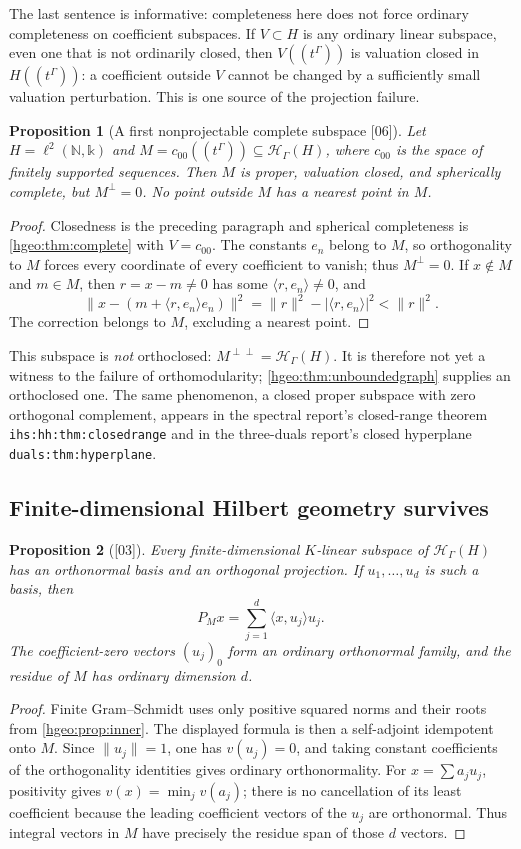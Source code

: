 \documentclass[11pt,letterpaper]{article}
\numberwithin{equation}{section}
\newtheorem{proposition}[proposition]{Proposition}
\theoremstyle{definition}
\theoremstyle{remark}
\newcommand{\N}{\mathbb N}
\newcommand{\kk}{\mathbb k}
\newcommand{\K}{K}
\newcommand{\HH}[1]{\mathscr H_\Gamma(#1)}
\newcommand{\ip}[2]{\langle #1,#2\rangle}
\newcommand{\norm}[1]{\lVert #1\rVert}
\newcommand{\abs}[1]{\lvert #1\rvert}
\newcommand{\src}[1]{\textup{\textsf{\small[#1]}}}
\newcommand{\replabel}[1]{\nolinkurl{#1}}
\begin{document}
The last sentence is informative: completeness here does not force
ordinary completeness on coefficient subspaces. If $V\subset H$ is
any ordinary linear subspace, even one that is not ordinarily closed,
then $V((t^\Gamma))$ is valuation closed in $H((t^\Gamma))$: a coefficient
outside $V$ cannot be changed by a sufficiently small valuation
perturbation. This is one source of the projection failure.

\begin{proposition}[A first nonprojectable complete subspace
\src{06}]\label{hgeo:prop:c00}
Let $H=\ell^2(\N,\kk)$ and $M=c_{00}((t^\Gamma))\subseteq\HH{H}$, where
$c_{00}$ is the space of finitely supported sequences. Then $M$ is proper,
valuation closed, and spherically complete, but $M^\perp=0$. No point
outside $M$ has a nearest point in $M$.
\end{proposition}
\begin{proof}
Closedness is the preceding paragraph and spherical completeness is
\cref{hgeo:thm:complete} with $V=c_{00}$. The constants $e_n$ belong to $M$,
so orthogonality to $M$ forces every coordinate of every coefficient to
vanish; thus $M^\perp=0$. If $x\notin M$ and $m\in M$, then $r=x-m\ne0$ has
some $\ip{r}{e_n}\ne0$, and
\[
 \norm{x-(m+\ip{r}{e_n}e_n)}^2
 =\norm{r}^2-\abs{\ip{r}{e_n}}^2<\norm{r}^2.
\]
The correction belongs to $M$, excluding a nearest point.
\end{proof}

This subspace is \emph{not} orthoclosed: $M^{\perp\perp}=\HH{H}$. It is
therefore not yet a witness to the failure of orthomodularity;
\cref{hgeo:thm:unboundedgraph} supplies an orthoclosed one. The same
phenomenon, a closed proper subspace with zero orthogonal complement,
appears in the spectral report's closed-range theorem
\replabel{ihs:hh:thm:closedrange} and in the three-duals report's closed
hyperplane \replabel{duals:thm:hyperplane}.

\subsection{Finite-dimensional Hilbert geometry survives}
\begin{proposition}[\src{03}]\label{hgeo:prop:finite}
Every finite-dimensional $\K$-linear subspace of $\HH{H}$ has an
orthonormal basis and an orthogonal projection. If
$u_1,\ldots,u_d$ is such a basis, then
\[
 P_Mx=\sum_{j=1}^d\ip{x}{u_j}u_j.
\]
The coefficient-zero vectors $(u_j)_0$ form an ordinary orthonormal
family, and the residue of $M$ has ordinary dimension $d$.
\end{proposition}
\begin{proof}
Finite Gram--Schmidt uses only positive squared norms and their roots
from \cref{hgeo:prop:inner}. The displayed formula is then a
self-adjoint idempotent onto $M$. Since $\norm{u_j}=1$, one has
$v(u_j)=0$, and taking constant coefficients of the orthogonality
identities gives ordinary orthonormality.
For $x=\sum a_ju_j$, positivity gives
$v(x)=\min_jv(a_j)$; there is no cancellation of its least coefficient
because the leading coefficient vectors of the $u_j$ are orthonormal.
Thus integral vectors in $M$ have precisely the residue span of those
$d$ vectors.
\end{proof}
\end{document}
